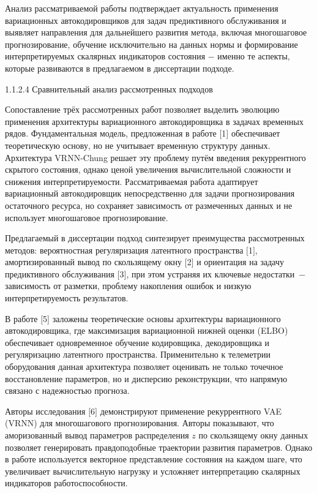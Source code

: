 \documentclass[14pt, a4paper, oneside]{extreport}
\begin{document}
Анализ рассматриваемой работы подтверждает актуальность применения вариационных автокодировщиков для задач предиктивного обслуживания и выявляет направления для дальнейшего развития метода, включая многошаговое прогнозирование, обучение исключительно на данных нормы и формирование интерпретируемых скалярных индикаторов состояния $-$ именно те аспекты, которые развиваются в предлагаемом в диссертации подходе.

\vspace{1em}
1.1.2.4 Сравнительный анализ рассмотренных подходов
\vspace{1em}

Сопоставление трёх рассмотренных работ позволяет выделить эволюцию применения архитектуры вариационного автокодировщика в задачах временных рядов. Фундаментальная модель, предложенная в работе $[$1$]$ обеспечивает теоретическую основу, но не учитывает временную структуру данных. Архитектура VRNN-Chung решает эту проблему путём введения рекуррентного скрытого состояния, однако ценой увеличения вычислительной сложности и снижения интерпретируемости. Рассматриваемая работа адаптирует вариационный автокодировщик непосредственно для задачи прогнозирования остаточного ресурса, но сохраняет зависимость от размеченных данных и не использует многошаговое прогнозирование.

Предлагаемый в диссертации подход синтезирует преимущества рассмотренных методов: вероятностная регуляризация латентного пространства $[$1$]$, амортизированный вывод по скользящему окну $[$2$]$ и ориентация на задачу предиктивного обслуживания $[$3$]$, при этом устраняя их ключевые недостатки~$-$ зависимость от разметки, проблему накопления ошибок и низкую интерпретируемость результатов.


В работе $[$5$]$ заложены теоретические основы архитектуры вариационного автокодировщика, где максимизация вариационной нижней оценки (ELBO) обеспечивает одновременное обучение кодировщика, декодировщика и регуляризацию латентного пространства. Применительно к телеметрии оборудования данная архитектура позволяет оценивать не только точечное восстановление параметров, но и дисперсию реконструкции, что напрямую связано с надежностью прогноза.

Авторы исследования $[$6$]$ демонстрируют применение рекуррентного VAE (VRNN) для многошагового прогнозирования. Авторы показывают, что аморизованный вывод параметров распределения $z$ по скользящему окну данных позволяет генерировать правдоподобные траектории развития параметров. Однако в работе используется векторное представление состояния на каждом шаге, что увеличивает вычислительную нагрузку и усложняет интерпретацию скалярных индикаторов работоспособности.
\end{document}
